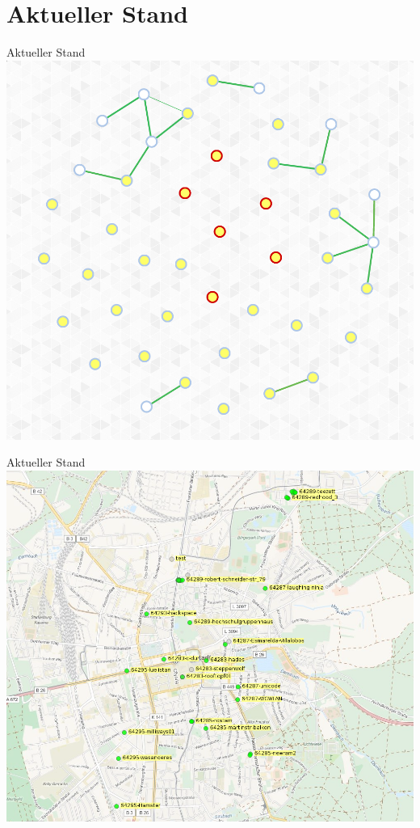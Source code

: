 \documentclass{beamer}
\begin{document}
\section{Aktueller Stand}
\begin{frame}{Aktueller Stand}
\vfill
\centering
\includegraphics[scale=0.25]{images/darmstadt-graph}
\vfill
\end{frame}

\begin{frame}{Aktueller Stand}
\vfill
\centering
\includegraphics[scale=0.4]{images/darmstadt-map}
\vfill
\end{frame}
\end{document}
